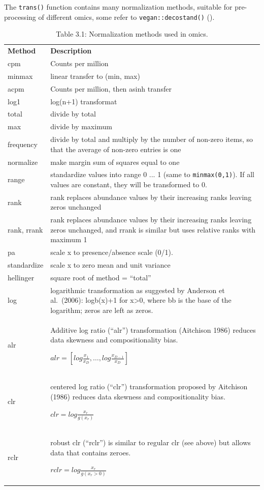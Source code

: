 \documentclass[
]{book}
\begin{document}
The \texttt{trans()} function contains many normalization methods, suitable for pre-processing of different omics, some refer to \texttt{vegan::decostand()} (\citet{R-vegan}).

\begin{longtable}[]{@{}
  >{\raggedright\arraybackslash}p{}
  >{\raggedright\arraybackslash}p{}@{}}
\caption{Table 3.1: Normalization methods used in omics.}\tabularnewline
\toprule()
\endhead
\textbf{Method} & \textbf{Description} \\
cpm & Counts per million \\
minmax & linear transfer to (min, max) \\
acpm & Counts per million, then asinh transfer \\
log1 & log(n+1) transformat \\
total & divide by total \\
max & divide by maximum \\
frequency & divide by total and multiply by the number of non-zero items, so that the average of non-zero entries is one \\
normalize & make margin sum of squares equal to one \\
range & standardize values into range 0 ... 1 (same to \texttt{minmax(0,1)}). If all values are constant, they will be transformed to 0. \\
rank & rank replaces abundance values by their increasing ranks leaving zeros unchanged \\
rank, rrank & rank replaces abundance values by their increasing ranks leaving zeros unchanged, and rrank is similar but uses relative ranks with maximum 1 \\
pa & scale x to presence/absence scale (0/1). \\
standardize & scale x to zero mean and unit variance \\
hellinger & square root of method = ``total'' \\
log & logarithmic transformation as suggested by Anderson et al.~(2006): logb(x)+1 for x\textgreater0, where bb is the base of the logarithm; zeros are left as zeros. \\
alr & Additive log ratio (``alr'') transformation (Aitchison 1986) reduces data skewness and compositionality bias.

\(alr=[log\frac{x_1}{x_D},…,log\frac{x_{D-1}}{x_D}]\) \\
clr & centered log ratio (``clr'') transformation proposed by Aitchison (1986) reduces data skewness and compositionality bias.

\(clr=log\frac{x_r}{g(x_r)}\) \\
rclr & robust clr (``rclr'') is similar to regular clr (see above) but allows data that contains zeroes.

\(rclr=log\frac{x_r}{g(x_r>0)}\) \\
\bottomrule()
\end{longtable}
\end{document}
